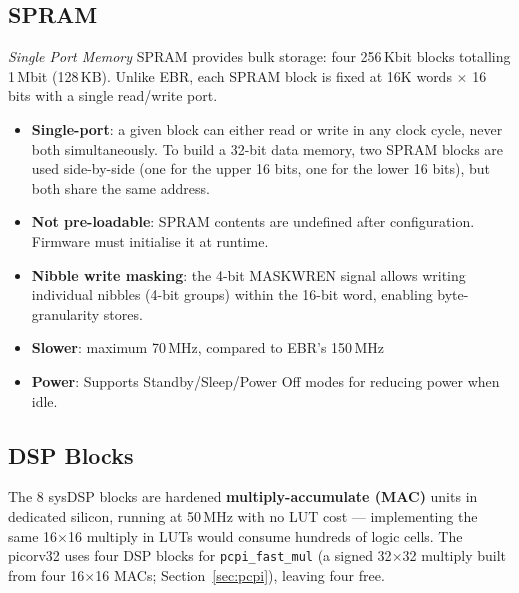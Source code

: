 \documentclass[9pt, a4paper]{extarticle}
\begin{document}
\subsection{SPRAM}

\textit{Single Port Memory} SPRAM provides bulk storage: four 256\,Kbit blocks totalling 1\,Mbit (128\,KB). Unlike EBR, each SPRAM block is fixed at 16K words $\times$ 16 bits with a single read/write port.

\begin{itemize}
    \item \textbf{Single-port}: a given block can either read or write in any clock cycle, never both simultaneously. To build a 32-bit data memory, two SPRAM blocks are used side-by-side (one for the upper 16 bits, one for the lower 16 bits), but both share the same address.
    \item \textbf{Not pre-loadable}: SPRAM contents are undefined after configuration. Firmware must initialise it at runtime.
    \item \textbf{Nibble write masking}: the 4-bit MASKWREN signal allows writing individual nibbles (4-bit groups) within the 16-bit word, enabling byte-granularity stores.
    \item \textbf{Slower}: maximum 70\,MHz, compared to EBR's 150\,MHz
    \item \textbf{Power}: Supports Standby/Sleep/Power Off modes for reducing power when idle.
\end{itemize}


\subsection{DSP Blocks}

The 8 sysDSP blocks are hardened \textbf{multiply-accumulate (MAC)} units in dedicated silicon, running at 50\,MHz with no LUT cost --- implementing the same 16$\times$16 multiply in LUTs would consume hundreds of logic cells. The picorv32 uses four DSP blocks for \texttt{pcpi\_fast\_mul} (a signed 32$\times$32 multiply built from four 16$\times$16 MACs; Section~\ref{sec:pcpi}), leaving four free.
\end{document}
